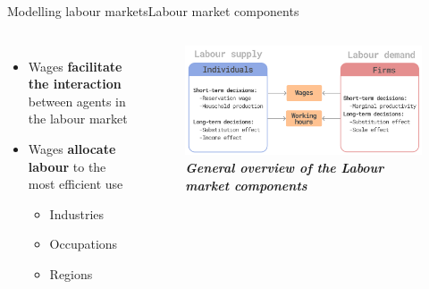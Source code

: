 \documentclass[aspectratio=169, xcolor=dvipsnames]{beamer}
\begin{document}
\begin{frame}{Modelling labour markets}{Labour market components}
    \vspace*{-25pt}
    \begin{columns}
            \begin{itemize}
                \setlength{\itemsep}{10pt} %
                \item \fontsize{10pt}{12pt}\selectfont Wages \textbf{facilitate the interaction} between agents in the labour market
                \item \fontsize{10pt}{12pt}\selectfont Wages \textbf{allocate labour} to the most efficient use
                \begin{itemize}
                    \item \fontsize{10pt}{12pt}\selectfont Industries
                    \item \fontsize{10pt}{12pt}\selectfont Occupations
                    \item \fontsize{10pt}{12pt}\selectfont Regions
                \end{itemize}
            \end{itemize}
            \begin{figure}
                \centering
                \includegraphics[width=1.0\textwidth]{./images/market_structure.png}
                \captionsetup{labelformat=empty}
                \caption{\fontsize{8pt}{8pt}\selectfont \textbf{\textit{General overview of the Labour market components}}}
            \end{figure}
    \end{columns}
\end{frame}    
\end{document}
